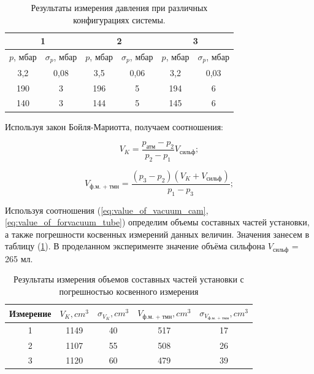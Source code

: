 \documentclass[a4paper, 12pt]{article} %
\begin{document}
\begin{table}[h]
	\begin{center}
		\begin{tabular}{|c|c|c|c|c|c|}
		\hline
		\multicolumn{2}{|c|}{1} & \multicolumn{2}{c|}{2} & \multicolumn{2}{c|}{3} \\ \hline
		$p$, мбар  & $\sigma_{p}$, мбар & $p$, мбар & $\sigma_{p}$, мбар & $p$, мбар & $\sigma_{p}$, мбар \\ \hline
		3,2     & 0,08         & 3,5    & 0,06         & 3,2 & 0,03         \\ \hline
		190      & 3            & 196     & 5            & 194     & 6            \\ \hline
		140      & 3            & 144     & 5            & 145     & 6            \\ \hline
		\end{tabular}
		\caption{Результаты измерения давления при различных конфигурациях системы.}
	\end{center}
\end{table}

Используя закон Бойля-Мариотта, получаем соотношения:

\begin{equation}
		V_{K} = \frac{p_{\text{атм}} - p_{2}}{p_{2} - p_{1}} V_{\text{сильф}};
		\label{eq:value_of_vacuum_cam}
\end{equation}
	
\begin{equation}
		V_{\text{ф.м. + тмн}} = \frac{ \left( p_{3} - p_{2}\right) \left( V_{K} + V_{\text{сильф}}\right) }{p_{1} - p_{3}};
		\label{eq:value_of_forvacuum_tube}
\end{equation}

Используя соотношения (\ref{eq:value_of_vacuum_cam}, \ref{eq:value_of_forvacuum_tube}) определим объемы составных частей установки, а также погрешности косвенных измерений данных величин. Значения занесем в таблицу (\ref{tab:resultsof_measuring_for_diffrent_part_value}). В проделанном эксперименте значение объёма сильфона $V_{\text{сильф}}$ = 265 мл.

\begin{table}[h]
	\begin{center}
		\begin{tabular}{|c|c|c|c|c|}
		\hline
		Измерение & $V_{K}, cm^{3}$ & $\sigma_{V_{K}}, cm^{3}$ & $V_{\text{ф.м. + тмн}}, cm^{3}$ & $\sigma_{V_{\text{ф.м. + тмн}}}, cm^{3}$ \\ \hline
		1 & 1149 & 40 & 517 & 17 \\ \hline
		2 & 1107 & 55 & 508 & 26 \\ \hline
		3 & 1120 & 60 & 479 & 39 \\ \hline
		\end{tabular}
	\end{center}
	\caption{Результаты измерения объемов составных частей установки с погрешностью косвенного измерения}
						\label{tab:resultsof_measuring_for_diffrent_part_value}
\end{table}
\end{document}
